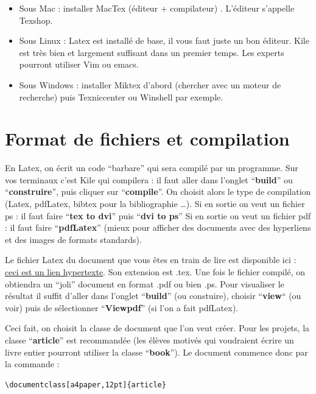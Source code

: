 \documentclass[a4paper,10pt]{book_ad}
\begin{document}
\begin{itemize}
\item Sous Mac : installer MacTex  (éditeur + compilateur) . L'éditeur s'appelle Texshop.  
\item Sous Linux : Latex est installé de base, il vous faut juste un bon éditeur. Kile est très
 bien et largement suffisant
dans un premier temps. Les experts pourront utiliser Vim ou emacs. 
\item Sous Windows : installer Miktex d'abord (chercher avec un moteur de recherche) puis Texniccenter 
ou  Winshell par exemple.
\end{itemize}


\section{Format de fichiers et compilation}

En Latex, on écrit un code ``barbare'' qui sera compil\'e par un programme. Sur vos terminaux c'est Kile 
qui compilera : il faut aller dans l'onglet ``\textbf{build}'' ou ``\textbf{construire}'', puis cliquer 
sur ``\textbf{compile}''. On choisit alors le type de compilation (Latex, pdfLatex, bibtex pour la
 bibliographie \ldots). 
Si en sortie on veut un fichier ps : il faut faire ``\textbf{tex to dvi}'' puis  ``\textbf{dvi to ps}''
Si en sortie on veut un fichier pdf : il faut faire ``\textbf{pdfLatex}'' (mieux pour afficher des documents 
avec des hyperliens et des images de formats standards).

Le fichier Latex du document que vous êtes en train de lire est  disponible ici : 
\href{http://people.math.jussieu.fr/~salmon/enseignement/M1/introlatex.tex}{ceci est un lien hypertexte}.  
Son extension est  .tex. Une fois le fichier compilé,  on obtiendra un ``joli'' document en format .pdf 
ou bien .ps. Pour visualiser le résultat il suffit d'aller dans l'onglet  ``\textbf{build}'' 
(ou constuire), choisir ``\textbf{view}`` (ou voir) puis de sélectionner ``\textbf{Viewpdf}'' 
(si l'on a fait pdfLatex).\medskip

Ceci fait, on choisit la classe de document  que l'on veut créer.  Pour les projets,  
la classe ``\textbf{article}'' est recommandée (les élèves motivés qui voudraient écrire un 
livre entier pourront utiliser la classe ``\textbf{book}''). Le document commence donc par la 
commande :\medskip

\begin{lstlisting}
\documentclass[a4paper,12pt]{article}
\end{lstlisting}
\end{document}
